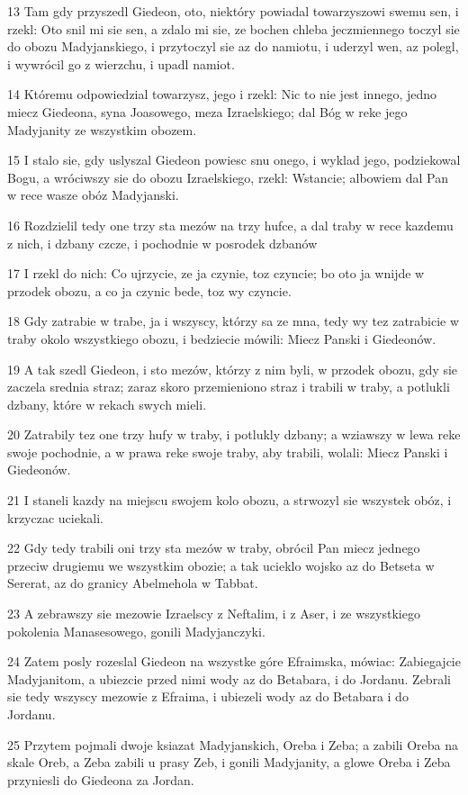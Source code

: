 \par 13 Tam gdy przyszedl Giedeon, oto, niektóry powiadal towarzyszowi swemu sen, i rzekl: Oto snil mi sie sen, a zdalo mi sie, ze bochen chleba jeczmiennego toczyl sie do obozu Madyjanskiego, i przytoczyl sie az do namiotu, i uderzyl wen, az polegl, i wywrócil go z wierzchu, i upadl namiot.
\par 14 Któremu odpowiedzial towarzysz, jego i rzekl: Nic to nie jest innego, jedno miecz Giedeona, syna Joasowego, meza Izraelskiego; dal Bóg w reke jego Madyjanity ze wszystkim obozem.
\par 15 I stalo sie, gdy uslyszal Giedeon powiesc snu onego, i wyklad jego, podziekowal Bogu, a wróciwszy sie do obozu Izraelskiego, rzekl: Wstancie; albowiem dal Pan w rece wasze obóz Madyjanski.
\par 16 Rozdzielil tedy one trzy sta mezów na trzy hufce, a dal traby w rece kazdemu z nich, i dzbany czcze, i pochodnie w posrodek dzbanów
\par 17 I rzekl do nich: Co ujrzycie, ze ja czynie, toz czyncie; bo oto ja wnijde w przodek obozu, a co ja czynic bede, toz wy czyncie.
\par 18 Gdy zatrabie w trabe, ja i wszyscy, którzy sa ze mna, tedy wy tez zatrabicie w traby okolo wszystkiego obozu, i bedziecie mówili: Miecz Panski i Giedeonów.
\par 19 A tak szedl Giedeon, i sto mezów, którzy z nim byli, w przodek obozu, gdy sie zaczela srednia straz; zaraz skoro przemieniono straz i trabili w traby, a potlukli dzbany, które w rekach swych mieli.
\par 20 Zatrabily tez one trzy hufy w traby, i potlukly dzbany; a wziawszy w lewa reke swoje pochodnie, a w prawa reke swoje traby, aby trabili, wolali: Miecz Panski i Giedeonów.
\par 21 I staneli kazdy na miejscu swojem kolo obozu, a strwozyl sie wszystek obóz, i krzyczac uciekali.
\par 22 Gdy tedy trabili oni trzy sta mezów w traby, obrócil Pan miecz jednego przeciw drugiemu we wszystkim obozie; a tak ucieklo wojsko az do Betseta w Sererat, az do granicy Abelmehola w Tabbat.
\par 23 A zebrawszy sie mezowie Izraelscy z Neftalim, i z Aser, i ze wszystkiego pokolenia Manasesowego, gonili Madyjanczyki.
\par 24 Zatem posly rozeslal Giedeon na wszystke góre Efraimska, mówiac: Zabiegajcie Madyjanitom, a ubiezcie przed nimi wody az do Betabara, i do Jordanu. Zebrali sie tedy wszyscy mezowie z Efraima, i ubiezeli wody az do Betabara i do Jordanu.
\par 25 Przytem pojmali dwoje ksiazat Madyjanskich, Oreba i Zeba; a zabili Oreba na skale Oreb, a Zeba zabili u prasy Zeb, i gonili Madyjanity, a glowe Oreba i Zeba przyniesli do Giedeona za Jordan.

